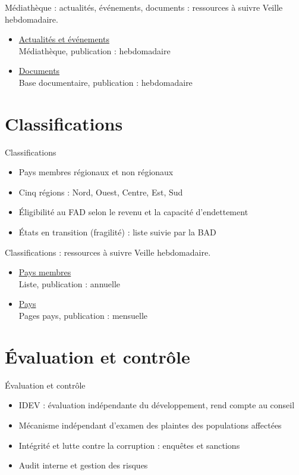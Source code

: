 \documentclass[aspectratio=169,11pt]{beamer}
\begin{document}
\begin{frame}{Médiathèque : actualités, événements, documents : ressources à suivre}
\small
Veille hebdomadaire.
\begin{itemize}
\item \href{https://www.afdb.org/en/news-and-events}{Actualités et événements}\\{\footnotesize Médiathèque, publication : hebdomadaire}
\item \href{https://www.afdb.org/en/documents}{Documents}\\{\footnotesize Base documentaire, publication : hebdomadaire}
\end{itemize}
\end{frame}

\section{Classifications}
\begin{frame}{Classifications}
\begin{itemize}
\item Pays membres régionaux et non régionaux
\item Cinq régions : Nord, Ouest, Centre, Est, Sud
\item Éligibilité au FAD selon le revenu et la capacité d'endettement
\item États en transition (fragilité) : liste suivie par la BAD
\end{itemize}
\end{frame}

\begin{frame}{Classifications : ressources à suivre}
\small
Veille hebdomadaire.
\begin{itemize}
\item \href{https://www.afdb.org/en/about-us/corporate-information/members}{Pays membres}\\{\footnotesize Liste, publication : annuelle}
\item \href{https://www.afdb.org/en/countries}{Pays}\\{\footnotesize Pages pays, publication : mensuelle}
\end{itemize}
\end{frame}

\section{Évaluation et contrôle}
\begin{frame}{Évaluation et contrôle}
\begin{itemize}
\item IDEV : évaluation indépendante du développement, rend compte au conseil
\item Mécanisme indépendant d'examen des plaintes des populations affectées
\item Intégrité et lutte contre la corruption : enquêtes et sanctions
\item Audit interne et gestion des risques
\end{itemize}
\end{frame}
\end{document}
